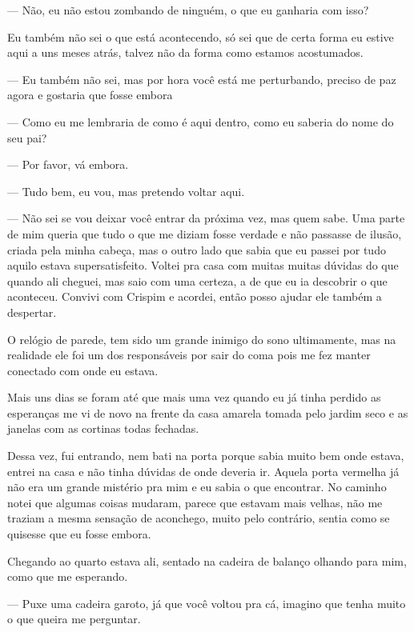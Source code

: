 — Não, eu não estou zombando de ninguém, o que eu ganharia com isso? 

Eu também não sei o que está acontecendo, só sei que de certa forma eu estive aqui a uns meses atrás, talvez não da forma como estamos acostumados.

— Eu também não sei, mas por hora você está me perturbando, preciso de paz agora e gostaria que fosse embora

— Como eu me lembraria de como é aqui dentro, como eu saberia do nome do seu pai?

— Por favor, vá embora.

— Tudo bem, eu vou, mas pretendo voltar aqui.

— Não sei se vou deixar você entrar da próxima vez, mas quem sabe.
Uma parte de mim queria que tudo o que me diziam fosse verdade e não passasse de ilusão, criada pela minha cabeça, mas o outro lado que sabia que eu passei por tudo aquilo estava supersatisfeito. Voltei pra casa com muitas muitas dúvidas do que quando ali cheguei, mas saio com uma certeza, a de que eu ia descobrir o que aconteceu. Convivi com Crispim e acordei, então posso ajudar ele também a despertar.

O relógio de parede, tem sido um grande inimigo do sono ultimamente, mas na realidade ele foi um dos responsáveis por sair do coma pois me fez manter conectado com onde eu estava.

Mais uns dias se foram até que mais uma vez quando eu já tinha perdido as esperanças me vi de novo na frente da casa amarela tomada pelo jardim seco e as janelas com as cortinas todas fechadas.

Dessa vez, fui entrando, nem bati na porta porque sabia muito bem onde estava, entrei na casa e não tinha dúvidas de onde deveria ir. Aquela porta vermelha já não era um grande mistério pra mim e eu sabia o que encontrar. No caminho notei que algumas coisas mudaram, parece que estavam mais velhas, não me traziam a mesma sensação de aconchego, muito pelo contrário, sentia como se quisesse que eu fosse embora. 

Chegando ao quarto estava ali, sentado na cadeira de balanço olhando para mim, como que me esperando.

— Puxe uma cadeira garoto, já que você voltou pra cá, imagino que tenha muito o que queira me perguntar.

